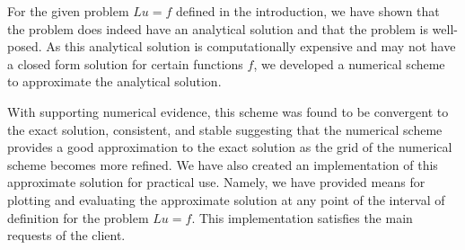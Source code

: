 For the given problem $Lu=f$ defined in the introduction,
we have shown that the problem does indeed have an analytical solution and that
the problem is well-posed. As this analytical solution is computationally expensive
and may not have a closed form solution for certain functions $f$, we developed
a numerical scheme to approximate the analytical solution.

With supporting numerical evidence, this scheme was found to be convergent to the exact solution, consistent, and stable suggesting
that the numerical scheme provides a good approximation to the exact solution as
the grid of the numerical scheme becomes more refined. We have also created an
implementation of this approximate solution for practical use. Namely, we have provided
means for plotting and evaluating the approximate solution at any point of the
interval of definition for the problem $Lu = f$. This implementation satisfies
the main requests of the client.